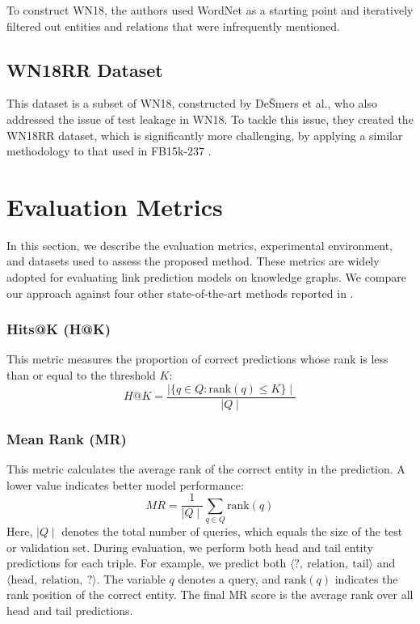 To construct WN18, the authors used WordNet as a starting point and iteratively filtered out entities and relations that were infrequently mentioned.



\subsection{WN18RR Dataset}

This dataset is a subset of WN18, constructed by DeŠmers et al.\cite{dettmers2017convolutional}, who also addressed the issue of test leakage in WN18. To tackle this issue, they created the WN18RR dataset, which is significantly more challenging, by applying a similar methodology to that used in FB15k-237 \cite{toutanova2015observed}.

\section{Evaluation Metrics}

In this section, we describe the evaluation metrics, experimental environment, and datasets used to assess the proposed method. These metrics are widely adopted for evaluating link prediction models on knowledge graphs. We compare our approach against four other state-of-the-art methods reported in \cite{rossi2020knowledge}.

\subsubsection{Hits@K (H@K)}

This metric measures the proportion of correct predictions whose rank is less than or equal to the threshold \(K\):
\[
H@K = \frac{\mid \{ q \in Q : \text{rank}(q) \leq K \} \mid}{\mid Q \mid}
\]

\subsubsection{Mean Rank (MR)}

This metric calculates the average rank of the correct entity in the prediction. A lower value indicates better model performance:
\[
MR = \frac{1}{\mid Q \mid} \sum_{q \in Q} \text{rank}(q)
\]
Here, \(\mid Q \mid\) denotes the total number of queries, which equals the size of the test or validation set. During evaluation, we perform both head and tail entity predictions for each triple. For example, we predict both \(\langle ?,~ \text{relation},~ \text{tail} \rangle\) and \(\langle \text{head},~ \text{relation},~ ? \rangle\). The variable \(q\) denotes a query, and \(\text{rank}(q)\) indicates the rank position of the correct entity. The final MR score is the average rank over all head and tail predictions.

